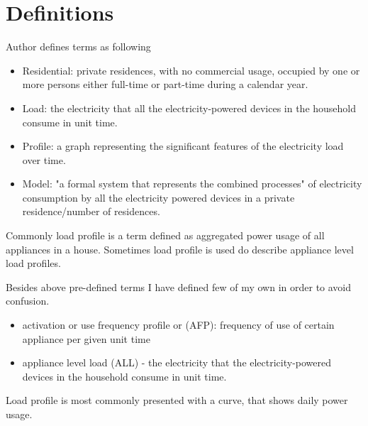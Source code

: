 \documentclass[
11pt, %
english, %
singlespacing, %
headsepline, %
]{MastersDoctoralThesis} %
\begin{document}
\chapter{Definitions}

Author \cite{Review2021} defines terms as following

\begin{itemize}
	\item Residential: private residences, with no commercial usage, occupied by one or more persons either full-time or part-time during a calendar year.
	\item Load: the electricity that all the electricity-powered devices in the household consume in unit time.
	\item Profile: a graph representing the significant features of the electricity load over time.
	\item Model: "a formal system that represents the combined processes" \cite{KAVOUSIAN2013184} of electricity consumption by all the electricity powered devices in a private residence/number of residences.
\end{itemize}

Commonly load profile is a term defined as aggregated power usage of all appliances in a house. 
Sometimes load profile is used do describe appliance level load profiles. 

Besides above pre-defined terms I have defined few of my own in order to avoid confusion.
\begin{itemize}
	\item activation or use frequency profile or (AFP): frequency of use of certain appliance per given unit time
	\item appliance level load (ALL) - the electricity that the electricity-powered devices in the household consume in unit time.
\end{itemize}

Load profile is most commonly presented with a curve, that shows daily power usage.
\end{document}

